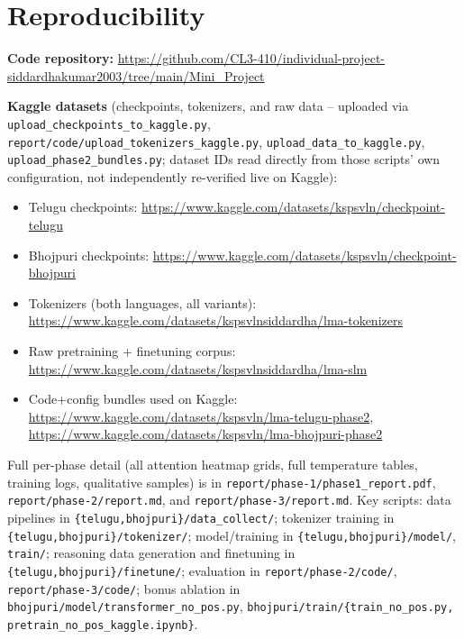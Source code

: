 \documentclass[10pt,a4paper]{article}
\begin{document}
\section*{Reproducibility}
\footnotesize
\textbf{Code repository:} \url{https://github.com/CL3-410/individual-project-siddardhakumar2003/tree/main/Mini_Project}

\textbf{Kaggle datasets} (checkpoints, tokenizers, and raw data -- uploaded via
\texttt{upload\_\allowbreak checkpoints\_\allowbreak to\_\allowbreak kaggle.py},
\texttt{report/\allowbreak code/\allowbreak upload\_\allowbreak tokenizers\_\allowbreak kaggle.py},
\texttt{upload\_\allowbreak data\_\allowbreak to\_\allowbreak kaggle.py},
\texttt{upload\_\allowbreak phase2\_\allowbreak bundles.py}; dataset IDs read directly from
those scripts' own configuration, not independently re-verified live on Kaggle):
\begin{itemize}[nosep, leftmargin=1.2em]
\item Telugu checkpoints: \url{https://www.kaggle.com/datasets/kspsvln/checkpoint-telugu}
\item Bhojpuri checkpoints: \url{https://www.kaggle.com/datasets/kspsvln/checkpoint-bhojpuri}
\item Tokenizers (both languages, all variants): \url{https://www.kaggle.com/datasets/kspsvlnsiddardha/lma-tokenizers}
\item Raw pretraining + finetuning corpus: \url{https://www.kaggle.com/datasets/kspsvlnsiddardha/lma-slm}
\item Code+config bundles used on Kaggle: \url{https://www.kaggle.com/datasets/kspsvln/lma-telugu-phase2}, \url{https://www.kaggle.com/datasets/kspsvln/lma-bhojpuri-phase2}
\end{itemize}

Full per-phase detail (all attention heatmap grids, full temperature tables, training logs,
qualitative samples) is in \texttt{report/\allowbreak phase-1/\allowbreak phase1\_report.pdf},
\texttt{report/\allowbreak phase-2/\allowbreak report.md}, and
\texttt{report/\allowbreak phase-3/\allowbreak report.md}. Key scripts:
data pipelines in \texttt{\{telugu,\allowbreak bhojpuri\}/\allowbreak data\_collect/}; tokenizer
training in \texttt{\{telugu,\allowbreak bhojpuri\}/\allowbreak tokenizer/}; model/training in
\texttt{\{telugu,\allowbreak bhojpuri\}/\allowbreak model/}, \texttt{train/}; reasoning data
generation and finetuning in \texttt{\{telugu,\allowbreak bhojpuri\}/\allowbreak finetune/};
evaluation in \texttt{report/\allowbreak phase-2/\allowbreak code/},
\texttt{report/\allowbreak phase-3/\allowbreak code/}; bonus ablation in
\texttt{bhojpuri/\allowbreak model/\allowbreak transformer\_no\_pos.py},
\texttt{bhojpuri/\allowbreak train/\allowbreak\{train\_no\_pos.py,\allowbreak
pretrain\_no\_pos\_\allowbreak kaggle.ipynb\}}.
\end{document}
